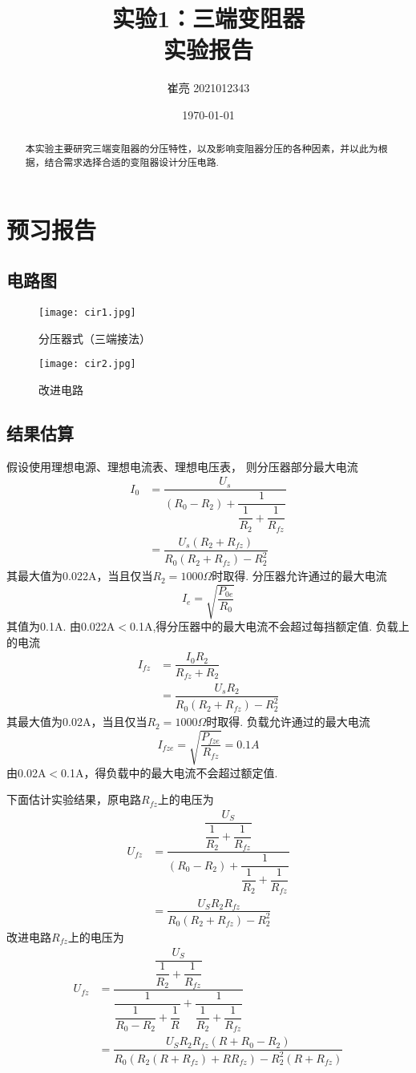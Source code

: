 \documentclass[12pt,a4paper,oneside,left=3.18,right=3.18,top=2.54,bottom=2.54]{ctexart}
\title{实验1：三端变阻器 \\ 实验报告}
\author{崔亮 2021012343}
\date{\today}
\begin{document}
\maketitle
\begin{abstract}
本实验主要研究三端变阻器的分压特性，以及影响变阻器分压的各种因素，并以此为根据，结合需求选择合适的变阻器设计分压电路.
\end{abstract}
\newpage
\tableofcontents
\newpage

\section{预习报告}
	\subsection{电路图}
		\begin{figure}[H]
		\centering
		\texttt{[image: cir1.jpg]}
		\caption{分压器式（三端接法）}
		\label{figure1}
		\texttt{[image: cir2.jpg]}
		\caption{改进电路}
		\label{figure2}
		\end{figure}
	\subsection{结果估算}
		假设使用理想电源、理想电流表、理想电压表，
		则分压器部分最大电流
		\begin{align}
		I_0 & = \dfrac{U_s}{(R_0-R_2)+\dfrac{1}{\dfrac{1}{R_2}+\dfrac{1}{R_{fz}}}}\nonumber\\
		 & = \dfrac{U_s(R_2+R_{fz})}{R_0(R_2+R_{fz})-R_2^2}
		\end{align}
		其最大值为0.022A，当且仅当$R_2=1000\Omega$时取得.
		分压器允许通过的最大电流
		$$I_{e}=\sqrt{\dfrac{P_{0e}}{R_0}}$$
		其值为0.1A.
		由0.022A$<$0.1A,得分压器中的最大电流不会超过每挡额定值.
		负载上的电流
		\begin{align}
		I_{fz} & = \dfrac{I_0R_2}{R_{fz}+R_2}\nonumber\\
		 & = \dfrac{U_sR_2}{R_0(R_2+R_{fz})-R_2^2}
		\end{align}
		其最大值为0.02A，当且仅当$R_2=1000\Omega$时取得.
		负载允许通过的最大电流
		$$I_{fze}=\sqrt{\dfrac{P_{fze}}{R_{fz}}}=0.1A$$
		由0.02A$<$0.1A，得负载中的最大电流不会超过额定值.\par
		下面估计实验结果，原电路$R_{fz}$上的电压为
		\begin{align}
		U_{fz} & = \dfrac{\dfrac{U_S}{\dfrac{1}{R_2}+\dfrac{1}{R_{fz}}}}{(R_0-R_2)+\dfrac{1}{\dfrac{1}{R_2}+\dfrac{1}{R_{fz}}}}\nonumber\\
		 & = \dfrac{U_SR_2R_{fz}}{R_0(R_2+R_{fz})-R_2^2}
		\end{align}
		改进电路$R_{fz}$上的电压为
		\begin{align}
		U_{fz} & = \dfrac{\dfrac{U_S}{\dfrac{1}{R_2}+\dfrac{1}{R_{fz}}}}{\dfrac{1}{\dfrac{1}{R_0-R_2}+\dfrac{1}{R}}+\dfrac{1}{\dfrac{1}{R_2}+\dfrac{1}{R_{fz}}}}\nonumber\\
		 & = \dfrac{U_SR_2R_{fz}(R+R_0-R_2)}{R_0(R_2(R+R_{fz})+RR_{fz})-R_2^2(R+R_{fz})}
		\end{align}
		\par
\end{document}
